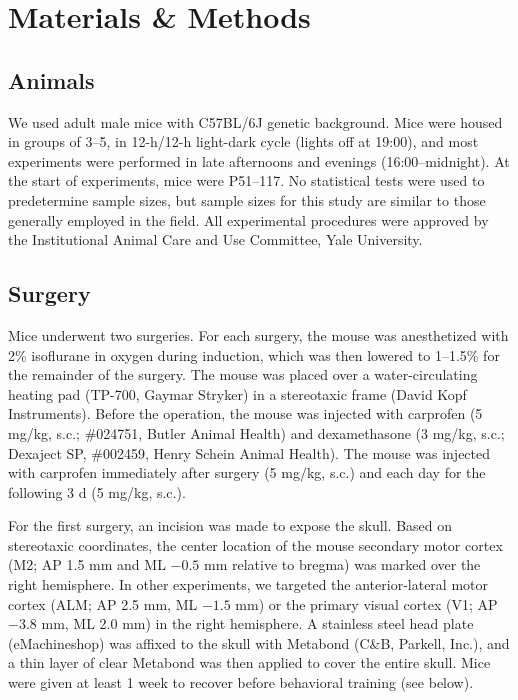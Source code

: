 \section{Materials \& Methods}

\subsection*{Animals}
We used adult male mice with C57BL/6J genetic background. Mice were housed in groups of 3--5, in 12-h/12-h light-dark cycle (lights off at 19:00), and most experiments were performed in late afternoons and evenings (16:00--midnight). At the start of experiments, mice were P51--117. No statistical tests were used to predetermine sample sizes, but sample sizes for this study are similar to those generally employed in the field. All experimental procedures were approved by the Institutional Animal Care and Use Committee, Yale University.

\subsection*{Surgery}
Mice underwent two surgeries. For each surgery, the mouse was anesthetized with 2\% isoflurane in oxygen during induction, which was then lowered to 1–1.5\% for the remainder of the surgery. The mouse was placed over a water-circulating heating pad (TP-700, Gaymar Stryker) in a stereotaxic frame (David Kopf Instruments). Before the operation, the mouse was injected with carprofen (5 mg/kg, s.c.; \#024751, Butler Animal Health) and dexamethasone (3 mg/kg, s.c.; Dexaject SP, \#002459, Henry Schein Animal Health). The mouse was injected with carprofen immediately after surgery (5 mg/kg, s.c.) and each day for the following 3 d (5 mg/kg, s.c.). 

For the first surgery, an incision was made to expose the skull. Based on stereotaxic coordinates, the center location of the mouse secondary motor cortex (M2; AP 1.5 mm and ML $-0.5$ mm relative to bregma) was marked over the right hemisphere. In other experiments, we targeted the anterior-lateral motor cortex (ALM; AP 2.5 mm, ML $-1.5$ mm) or the primary visual cortex (V1; AP $-3.8$ mm, ML 2.0 mm) in the right hemisphere. A stainless steel head plate (eMachineshop) was affixed to the skull with Metabond (C\&B, Parkell, Inc.), and a thin layer of clear Metabond was then applied to cover the entire skull. Mice were given at least 1 week to recover before behavioral training (see below). 

